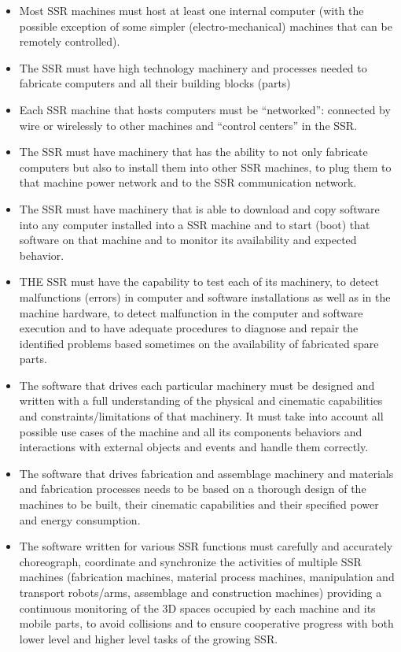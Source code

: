\bigskip

\begin{itemize}
\item Most SSR machines must host at least one internal computer (with
the possible exception of some simpler (electro-mechanical) machines
that can be remotely controlled).
\item The SSR must have high technology machinery and processes needed
to fabricate computers and all their building blocks (parts)
\item Each SSR machine that hosts computers must be “networked”:
connected by wire or wirelessly to other machines and “control centers”
in the SSR.
\item The SSR must have machinery that has the ability to not only
fabricate computers but also to install them into other SSR machines,
to plug them to that machine power network and to the SSR communication
network.
\item The SSR must have machinery that is able to download and copy
software into any computer installed into a SSR machine and to start
(boot) that software on that machine and to monitor its availability
and expected behavior.
\item THE SSR must have the capability to test each of its machinery, to
detect malfunctions (errors) in computer and software installations as
well as in the machine hardware, to detect malfunction in the computer
and software execution and to have adequate procedures to diagnose and
repair the identified problems based sometimes on the availability of
fabricated spare parts.
\item The software that drives each particular machinery must be
designed and written with a full understanding of the physical and
cinematic capabilities and constraints/limitations of that machinery.
It must take into account all possible use cases of the machine and all
its components behaviors and interactions with external objects and
events and handle them correctly.
\item The software that drives fabrication and assemblage machinery and
materials and fabrication processes needs to be based on a thorough
design of the machines to be built, their cinematic capabilities and
their specified power and energy consumption.
\item The software written for various SSR functions must carefully and
accurately choreograph, coordinate and synchronize the activities of
multiple SSR machines (fabrication machines, material process machines,
manipulation and transport robots/arms, assemblage and construction
machines) providing a continuous monitoring of the 3D spaces occupied
by each machine and its mobile parts, to avoid collisions and to ensure
cooperative progress with both lower level and higher level tasks of
the growing SSR.
\end{itemize}
